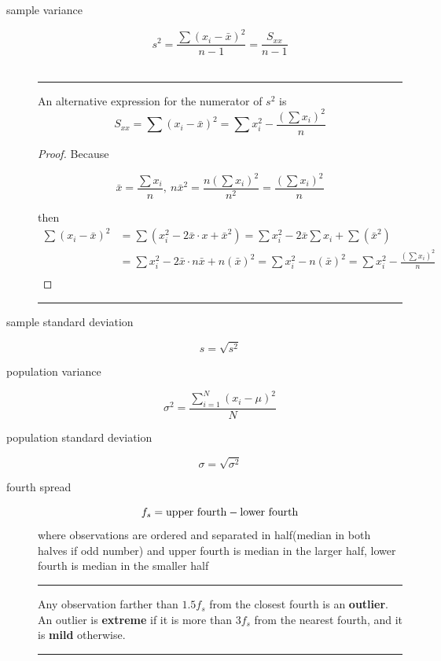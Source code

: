 \begin{description}
	\item[sample variance]
	$$ s ^ 2 = \frac{\sum \left(x_i - \bar{x}\right) ^ 2}{n - 1} = \frac{S_{xx}}{n - 1}$$\\
	\rule{\linewidth}{1pt}
	\par An alternative expression for the numerator of $s ^ 2$ is
	$$S_{xx} = \sum \left( x_i - \bar{x} \right) ^ 2 = \sum x_i ^ 2 - \frac{\left( \sum x_i \right) ^ 2}{n} $$
	\begin{proof}
		Because
		
		$$\bar{x} = \frac{\sum x_i}{n},\ n\bar{x} ^ 2= \frac{n\left( \sum x_i \right) ^ 2}{n ^ 2} = \frac{\left( \sum x_i \right) ^ 2}{n} $$
		
		then
		\begin{align*}
		\sum\left( x_i - \bar{x} \right) ^ 2 &= \sum \left( x_i ^ 2 - 2 \bar{x}\cdot x + \bar{x} ^ 2\right) = \sum x_i ^ 2 - 2 \bar{x}\sum x_i + \sum \left( \bar{x} ^ 2 \right) \\
		&= \sum x_i ^ 2 - 2 \bar{x} \cdot n \bar{x} + n \left( \bar{x} \right) ^ 2 = \sum x_i ^ 2 - n \left( \bar{x} \right) ^ 2 = \sum x_i ^ 2 - \frac{\left( \sum x_i\right) ^ 2}{n} \tag*{\qedhere}\\
		\end{align*}
	\end{proof}
	\rule{\linewidth}{1pt}
	\item[sample standard deviation]
	$$ s = \sqrt{s ^ 2} $$
	\item[population variance]
	$$ \sigma ^ 2 = \frac{\sum\limits_{i = 1} ^ {N} \left( x_i - \mu \right) ^2}{N} $$
	\item[population standard deviation]
	$$ \sigma = \sqrt{\sigma ^ 2} $$
	\item[fourth spread]
	$$f_s={\rm upper\ fourth} - {\rm lower\ fourth}$$
	where observations are ordered and separated in half(median in both halves if odd number) and upper fourth is median in the larger half, lower fourth is median in the smaller half\\
	\rule{\linewidth}{1pt}
	\par Any observation farther than $1.5f_s$ from the closest fourth is an \textbf{outlier}. An outlier is \textbf{extreme} if it is more than $3f_s$ from the nearest fourth, and it is \textbf{mild} otherwise.\\
	\rule{\linewidth}{1pt}
\end{description}
